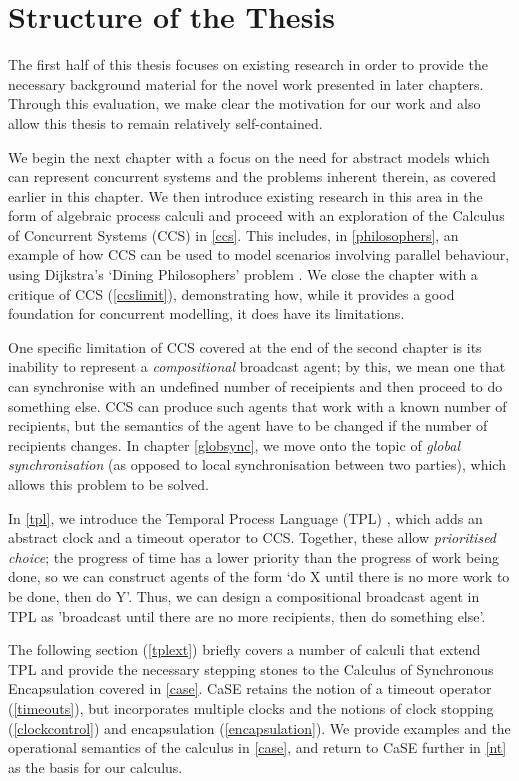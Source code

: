 \section{Structure of the Thesis}

The first half of this thesis focuses on existing research in order to
provide the necessary background material for the novel work presented
in later chapters.  Through this evaluation, we make clear the
motivation for our work and also allow this thesis to remain
relatively self-contained.  

We begin the next chapter with a focus on the need for abstract models
which can represent concurrent systems and the problems inherent
therein, as covered earlier in this chapter.  We then introduce
existing research in this area in the form of algebraic process
calculi and proceed with an exploration of the Calculus of Concurrent
Systems (CCS) \cite{milner:ccs} in \ref{ccs}.  This includes, in
\ref{philosophers}, an example of how CCS can be used to model
scenarios involving parallel behaviour, using Dijkstra's
`Dining Philosophers' problem \cite{dijkstra:philosophers}.  We close
the chapter with a critique of CCS (\ref{ccslimit}), demonstrating
how, while it provides a good foundation for concurrent modelling, it
does have its limitations.

One specific limitation of CCS covered at the end of the second
chapter is its inability to represent a \emph{compositional} broadcast
agent; by this, we mean one that can synchronise with an undefined
number of receipients and then proceed to do something else.  CCS can
produce such agents that work with a known number of recipients, but
the semantics of the agent have to be changed if the number of
recipients changes.  In chapter \ref{globsync}, we move onto the topic
of \emph{global synchronisation} (as opposed to local synchronisation
between two parties), which allows this problem to be solved.

In \ref{tpl}, we introduce the Temporal Process Language (TPL)
\cite{hennessy:tpl}, which adds an abstract clock and a timeout
operator to CCS.  Together, these allow \emph{prioritised choice}; the
progress of time has a lower priority than the progress of work being
done, so we can construct agents of the form `do X until there is no
more work to be done, then do Y'.  Thus, we can design a compositional
broadcast agent in TPL as 'broadcast until there are no more
recipients, then do something else'.

The following section (\ref{tplext}) briefly covers a number of
calculi that extend TPL and provide the necessary stepping stones to
the Calculus of Synchronous Encapsulation \cite{CaSE} covered in
\ref{case}.  CaSE retains the notion of a timeout operator
(\ref{timeouts}), but incorporates multiple clocks and the notions of
clock stopping (\ref{clockcontrol}) and encapsulation
(\ref{encapsulation}).  We provide examples and the operational
semantics of the calculus in \ref{case}, and return to CaSE further in
\ref{nt} as the basis for our calculus.

